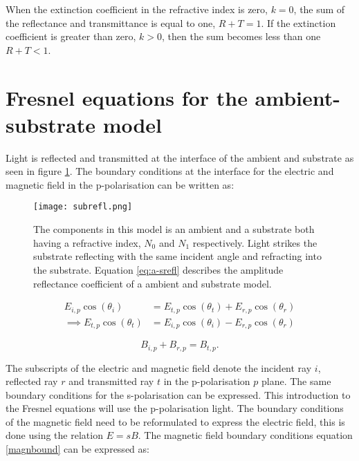 \documentclass[MasterThesisMain.tex]{subfiles}
\begin{document}
When the extinction coefficient in the refractive index is zero, $k=0$, the sum of the reflectance and transmittance is equal to one, $R + T = 1$. If the extinction coefficient is greater than zero, $k>0$, then the sum becomes less than one $R + T < 1$.	
\section{Fresnel equations for the ambient-substrate model}\label{ch:fresnelref}
Light is reflected and transmitted at the interface of the ambient and substrate as seen in figure \ref{fig:subrefl}. The boundary conditions at the interface for the electric and magnetic field in the p-polarisation can be written as:

\begin{figure}
\begin{center}
\texttt{[image: subrefl.png]}
\caption{The components in this model is an ambient and a substrate both having a refractive index, $N_0$ and $N_1$ respectively. Light strikes the substrate reflecting with the same incident angle and refracting into the substrate. Equation \ref{eq:a-srefl} describes the amplitude reflectance coefficient of a ambient and substrate model.}
\label{fig:subrefl}
\end{center}
\end{figure}

\begin{align} 
E_{i,p}\cos{(\theta_i)} &= E_{t,p}\cos{(\theta_t)} + E_{r,p}\cos{(\theta_r)}\\
\implies E_{t,p}\cos{(\theta_t)} &= E_{i,p}\cos{(\theta_i)} - E_{r,p}\cos{(\theta_r)}\label{elbound}
\end{align} 

\begin{equation} \label{magnbound}
B_{i,p} + B_{r,p} = B_{t,p}.
\end{equation}

The subscripts of the electric and magnetic field denote the incident ray $i$, reflected ray $r$ and transmitted ray $t$ in the p-polarisation $p$ plane. The same boundary conditions for the s-polarisation can be expressed. This introduction to the Fresnel equations will use the p-polarisation light. The boundary conditions of the magnetic field need to be reformulated to express the electric field, this is done using the relation $E=sB$. The magnetic field boundary conditions equation \ref{magnbound} can be expressed as:
\end{document}
